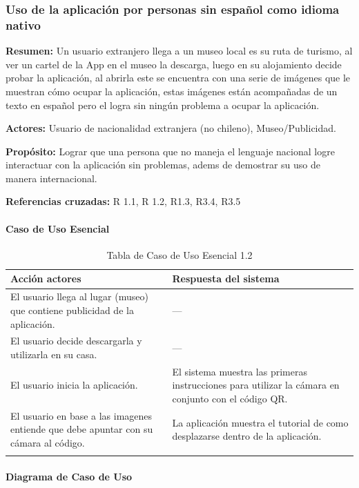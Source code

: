 \subsubsection{Uso de la aplicación por personas sin español como idioma nativo}

{\textbf {Resumen:}}
Un usuario extranjero llega a un museo local es su ruta de turismo, al ver un cartel de la App en el museo la descarga, luego en su alojamiento decide probar la aplicación, al abrirla este se encuentra con una serie de imágenes que le muestran cómo ocupar la aplicación, estas imágenes están acompañadas de un texto en español pero el logra sin ningún problema a ocupar la aplicación.

{\textbf {Actores:}}
Usuario de nacionalidad extranjera (no chileno), Museo/Publicidad.

{\textbf {Propósito:}}
Lograr que una persona que no maneja el lenguaje nacional logre interactuar con la aplicación sin problemas, adems de demostrar su uso de manera internacional.

{\textbf {Referencias cruzadas:}}
R 1.1, R 1.2, R1.3, R3.4, R3.5

\paragraph{Caso de Uso Esencial}

\begin{longtable}{|p{5cm}|p{8cm}|}
\hline 
Acción actores & Respuesta del sistema \\ 
\hline 
El usuario llega al lugar (museo) que contiene publicidad de la aplicación. & --- \\ 
\hline 
El usuario decide descargarla y utilizarla en su casa. & --- \\ 
\hline 
El usuario inicia la aplicación. & El sistema muestra las primeras instrucciones para utilizar la cámara en conjunto con el código QR.
 \\ 
\hline 
El usuario en base a las imagenes entiende que debe apuntar con su cámara al código. & La aplicación muestra el tutorial de como desplazarse dentro de la aplicación. \\ 
\hline 
\caption{Tabla de Caso de Uso Esencial 1.2}
\label{tab22}
\end{longtable}

\paragraph{Diagrama de Caso de Uso}


